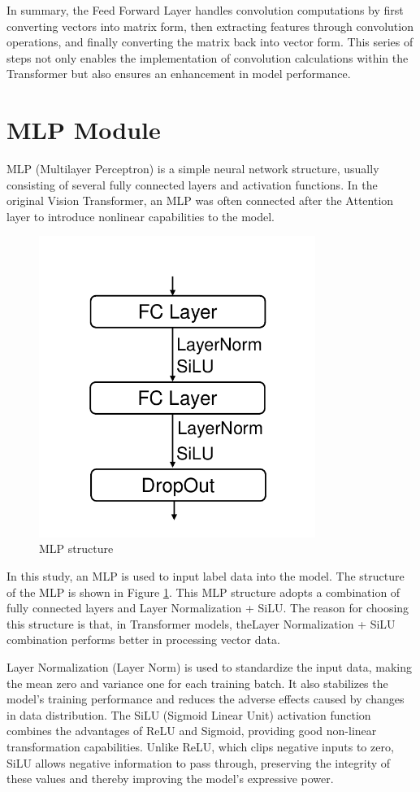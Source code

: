 \documentclass[12pt]{report}
\begin{document}
In summary, the Feed Forward Layer handles convolution computations by first converting vectors into matrix form, then extracting features through convolution operations, and finally converting the matrix back into vector form. This series of steps not only enables the implementation of convolution calculations within the Transformer but also ensures an enhancement in model performance.

\section{MLP Module }
MLP (Multilayer Perceptron) is a simple neural network structure, usually consisting of several fully connected layers and activation functions. In the original Vision Transformer, an MLP was often connected after the Attention layer to introduce nonlinear capabilities to the model.

\begin{figure}[thbp]
    \centering
    \includegraphics[width=9cm]{image/MLP.pdf}
    \caption{MLP structure}
    \label{fig:MLP}
\end{figure}

In this study, an MLP is used to input label data into the model. The structure of the MLP is shown in Figure \ref{fig:MLP}. This MLP structure adopts a combination of fully connected layers and Layer Normalization + SiLU. The reason for choosing this structure is that, in Transformer models, theLayer Normalization + SiLU combination performs better in processing vector data.

Layer Normalization (Layer Norm) is used to standardize the input data, making the mean zero and variance one for each training batch. It also stabilizes the model's training performance and reduces the adverse effects caused by changes in data distribution. The SiLU (Sigmoid Linear Unit) activation function combines the advantages of ReLU and Sigmoid, providing good non-linear transformation capabilities. Unlike ReLU, which clips negative inputs to zero, SiLU allows negative information to pass through, preserving the integrity of these values and thereby improving the model's expressive power.
\end{document}
